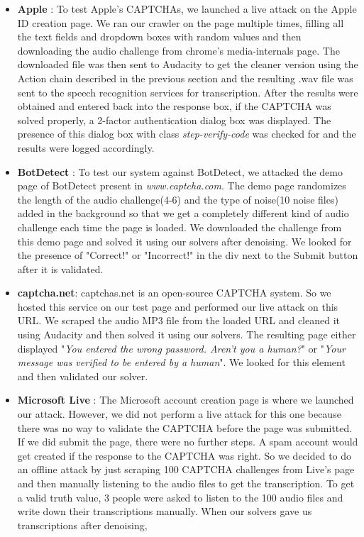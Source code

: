\begin{itemize}
\item \textbf{Apple} : To test Apple's CAPTCHAs, we launched a live attack on the Apple ID creation page. We ran our crawler on the page multiple times, filling all the text fields and dropdown boxes with random values and then downloading the audio challenge from chrome's media-internals page. The downloaded file was then sent to Audacity to get the cleaner version using the Action chain described in the previous section and the resulting .wav file was sent to the speech recognition services for transcription. After the results were obtained and entered back into the response box, if the CAPTCHA was solved properly, a 2-factor authentication dialog box was displayed. The presence of this dialog box with class \textit{step-verify-code} was checked for and the results were logged accordingly.

\item \textbf{BotDetect} : To test our system against BotDetect, we attacked the demo page of BotDetect present in \textit{www.captcha.com}. The demo page randomizes the length of the audio challenge(4-6) and the type of noise(10 noise files) added in the background so that we get a completely different kind of audio challenge each time the page is loaded. We downloaded the challenge from this demo page and solved it using our solvers after denoising. We looked for the presence of "Correct!" or "Incorrect!" in the div next to the Submit button after it is validated. 

\item \textbf{captcha.net}: captchas.net is an open-source CAPTCHA system. So we hosted this service on our test page and performed our live attack on this URL. We scraped the audio MP3 file from the loaded URL and cleaned it using Audacity and then solved it using our solvers. The resulting page either displayed "\textit{You entered the wrong password. Aren't you a human?}" or "\textit{Your message was verified to be entered by a human}". We looked for this element and then validated our solver.

\item \textbf{Microsoft Live} : The Microsoft account creation page is where we launched our attack. However, we did not perform a live attack for this one because there was no way to validate the CAPTCHA before the page was submitted. If we did submit the page, there were no further steps. A spam account would get created if the response to the CAPTCHA was right. So we decided to do an offline attack by just scraping 100 CAPTCHA challenges from Live's page and then manually listening to the audio files to get the transcription. To get a valid truth value, 3 people were asked to listen to the 100 audio files and write down their transcriptions manually. When our solvers gave us transcriptions after denoising, 


\end{itemize}
